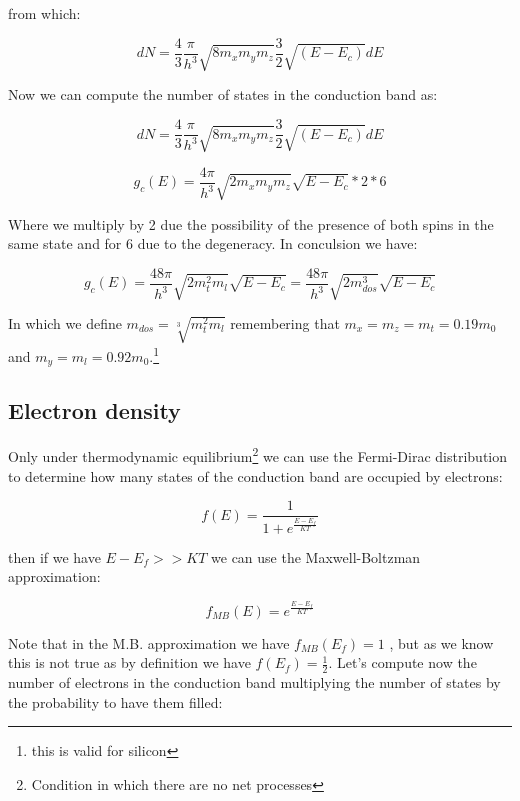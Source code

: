 			from which:

			\begin{equation}
				dN=\frac{4}{3} \frac{\pi}{h^3} {\sqrt{8m_x m_y m_z}}\frac{3}{2}\sqrt{(E-E_c)}dE
			\end{equation}

			Now we can compute the number of states in the conduction band as:

			\begin{equation}
				dN=\frac{4}{3} \frac{\pi}{h^3} {\sqrt{8m_x m_y m_z}}\frac{3}{2}\sqrt{(E-E_c)}dE
			\end{equation}

			\begin{equation}
				g_c(E)=\frac{4\pi}{h^3}\sqrt{2 m_x m_y m_z} \sqrt{E-E_c} * 2 * 6
			\end{equation}
		
			Where we multiply by 2 due the possibility of the presence of both spins in the same state and for 6 due to the degeneracy.
			In conculsion we have:

			\begin{equation}
				g_c(E)=\frac{48\pi}{h^3}\sqrt{2 m_t^2 m_l} \sqrt{E-E_c}=\frac{48\pi}{h^3}\sqrt{2 m_{dos}^3} \sqrt{E-E_c}
			\end{equation}

			In which we define $m_{dos}=\sqrt[3]{m_t^2m_l}$ remembering that $m_x=m_z=m_t=0.19m_0$ and $m_y=m_l=0.92m_0$.\footnote{this is valid for silicon}

		\subsection{Electron density}

			Only under thermodynamic equilibrium\footnote{Condition in which there are no net processes} we can use the Fermi-Dirac distribution to determine how many states of the conduction band are occupied by electrons:

			\begin{equation}
				f(E)=\frac{1}{1+e^{ \frac{E-E_f}{KT} } }
			\end{equation}

			then if we have $E-E_f >> KT$ we can use the Maxwell-Boltzman approximation:

			\begin{equation}
				f_{MB}(E)=e^{ \frac{E-E_f}{KT}}
			\end{equation}
			
			Note that in the M.B. approximation we have $f_{MB}(E_f)=1$ , but as we know this is not true as by definition we have $f(E_f)=\frac{1}{2}$.
			Let's compute now the number of electrons in the conduction band multiplying the number of states by the probability to have them filled:

